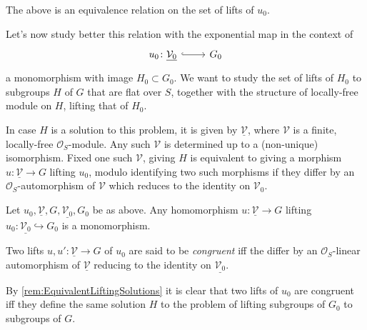 \begin{rem}[]
	The above is an equivalence relation on the set of lifts of $u_0$.
\end{rem}


\noindent
Let's now study better this relation with the exponential map in the context of
\begin{equation*}
\begin{tikzcd}[row sep = 0ex
	,/tikz/column 1/.append style={anchor=base east}
	,/tikz/column 2/.append style={anchor=base west}]
	u_0\colon \underline{\mathcal{V}_0} 
	\arrow[r, "", hookrightarrow] &
	G_0
\end{tikzcd}
\end{equation*} 
a monomorphism with image $H_0 \subset G_0$.
We want to study the set of lifts of $H_0$ to
subgroups $H$ of $G$ that are flat over $S$, together with the structure
of locally-free module on $H$, lifting that of $H_0$.


\begin{rem}\label{rem:EquivalentLiftingSolutions}
	In case $H$ is a solution to this problem, it is given by
	$\underline{\mathcal{V}}$, where $\mathcal{V}$ is a finite, locally-free $\mathcal{O}_{ S }$-module.
	Any such $\mathcal{V}$ is determined up to a (non-unique) isomorphism.
	Fixed one such $\mathcal{V}$, giving $H$ is equivalent to giving a morphism
	$u\colon \underline{\mathcal{V}} \to G$ lifting $u_0$, modulo identifying
	two such morphisms if they differ by an $\mathcal{O}_{ S }$-automorphism
	of $\mathcal{V}$ which reduces to the identity on $\mathcal{V}_0$.
\end{rem}


\begin{lem}
	Let $u_0, \underline{\mathcal{V}}, G, \underline{\mathcal{V}_0}, G_0$ be as above.
	Any homomorphism $u\colon \underline{\mathcal{V}} \to G$ lifting 
	$u_0\colon \underline{\mathcal{V}_0} \hookrightarrow G_0$
	is a monomorphism.
\end{lem} 


\begin{defn}
	Two lifts $u, u'\colon \underline{\mathcal{V}} \to G$ of $u_0$ are said to
	be \emph{congruent} iff the differ by an $\mathcal{O}_{ S }$-linear
	automorphism of $\underline{\mathcal{V}}$ reducing 
	to the identity on $\underline{\mathcal{V}_0}$.
\end{defn}


\begin{rem}[]
	By \cref{rem:EquivalentLiftingSolutions} it is clear that
	two lifts of $u_0$ are congruent iff they define the same solution
	$H$ to the problem of lifting subgroups of $G_0$ to subgroups of $G$.
\end{rem}


